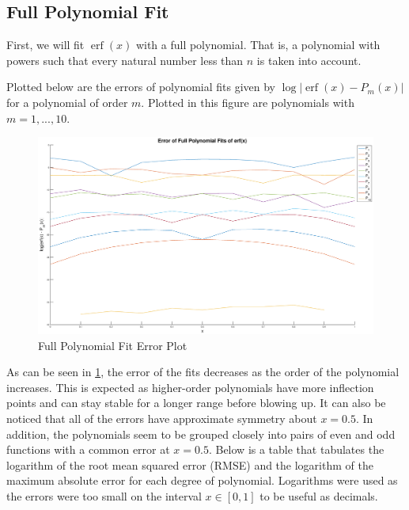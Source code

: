 \documentclass[10pt,a4paper]{article}
\DeclareMathOperator\erf{erf}
\begin{document}
\subsection*{Full Polynomial Fit}

First, we will fit $\erf{(x)}$ with a full polynomial. That is, a polynomial with powers such that every natural number less than $n$ is taken into account.

Plotted below are the errors of polynomial fits given by $\log \left| \erf{(x)} - P_m(x) \right|$ for a polynomial of order $m$. Plotted in this figure are polynomials with $m = 1, ..., 10$.

\begin{figure}[H]
\includegraphics[width=\linewidth]{Figures/fullpolyerror.eps}
\caption{Full Polynomial Fit Error Plot}
\label{fig: fullerror}
\end{figure}

As can be seen in \cref{fig: fullerror}, the error of the fits decreases as the order of the polynomial increases. This is expected as higher-order polynomials have more inflection points and can stay stable for a longer range before blowing up. It can also be noticed that all of the errors have approximate symmetry about $x=0.5$. In addition, the polynomials seem to be grouped closely into pairs of even and odd functions with a common error at $x=0.5$. Below is a table that tabulates the logarithm of the root mean squared error (RMSE) and the logarithm of the maximum absolute error for each degree of polynomial. Logarithms were used as the errors were too small on the interval $x \in [0,1]$ to be useful as decimals.
\end{document}
